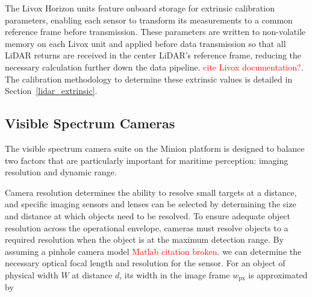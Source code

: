 \documentclass{erauthesis}
\begin{document}





The Livox Horizon units feature onboard storage for extrinsic calibration parameters, enabling each sensor to transform its measurements to a common reference frame before transmission.
These parameters are written to non-volatile memory on each Livox unit and applied before data transmission so that all LiDAR returns are received in the center \ac{LiDAR}'s reference frame, reducing the necessary calculation further down the data pipeline.
\textcolor{red}{cite Livox documentation?}.
The calibration methodology to determine these extrinsic values is detailed in Section~\ref{lidar_extrinsic}.



\subsection{Visible Spectrum Cameras} \label{visual_cameras}

The visible spectrum camera suite on the Minion platform is designed to balance two factors that are particularly important for maritime perception: imaging resolution and dynamic range.  

Camera resolution determines the ability to resolve small targets at a distance, and specific imaging sensors and lenses can be selected by determining the size and distance at which objects need to be resolved.
To ensure adequate object resolution across the operational envelope, cameras must resolve objects to a required resolution when the object is at the maximum detection range. 
By assuming a pinhole camera model \textcolor{red}{Matlab citation broken}.
we can determine the necessary optical focal length and resolution for the sensor.
For an object of physical width $W$ at distance $d$, its width in the image frame $w_{\text{px}}$ is approximated by
\end{document}
